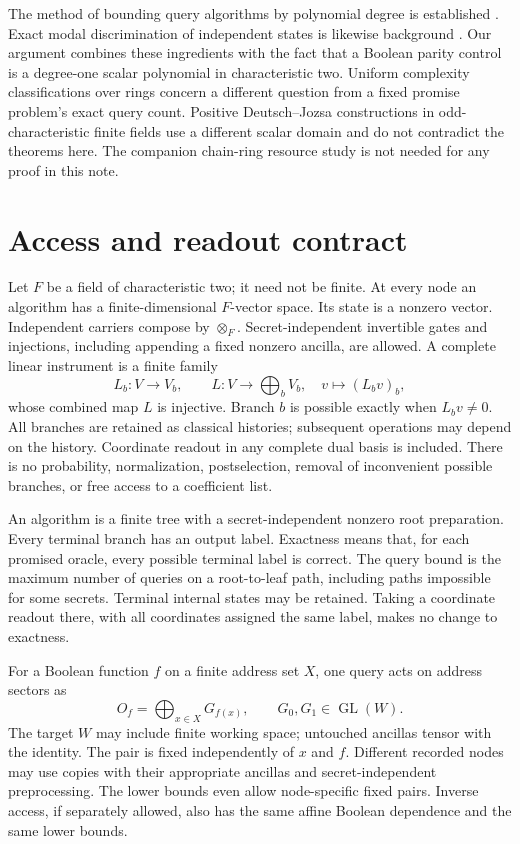 \documentclass[11pt]{article}
\DeclareMathOperator{\GL}{GL}
\begin{document}
The method of bounding query algorithms by polynomial degree is established \cite{Beals2001}. Exact modal discrimination of independent states is likewise background \cite{Diamond2023}. Our argument combines these ingredients with the fact that a Boolean parity control is a degree-one scalar polynomial in characteristic two. Uniform complexity classifications over rings \cite{deBeaudrap2014} concern a different question from a fixed promise problem's exact query count. Positive Deutsch--Jozsa constructions in odd-characteristic finite fields \cite{Hanson2011,Tai2019} use a different scalar domain and do not contradict the theorems here. The companion chain-ring resource study is not needed for any proof in this note.

\section{Access and readout contract}\label{sec:contract}
Let $F$ be a field of characteristic two; it need not be finite. At every node an algorithm has a finite-dimensional $F$-vector space. Its state is a nonzero vector. Independent carriers compose by $\otimes_F$. Secret-independent invertible gates and injections, including appending a fixed nonzero ancilla, are allowed. A complete linear instrument is a finite family
\[
 L_b:V\longrightarrow V_b,\qquad
 L:V\longrightarrow\bigoplus_bV_b,\quad v\longmapsto (L_bv)_b,
\]
whose combined map $L$ is injective. Branch $b$ is possible exactly when $L_bv\ne0$. All branches are retained as classical histories; subsequent operations may depend on the history. Coordinate readout in any complete dual basis is included. There is no probability, normalization, postselection, removal of inconvenient possible branches, or free access to a coefficient list.

An algorithm is a finite tree with a secret-independent nonzero root preparation. Every terminal branch has an output label. Exactness means that, for each promised oracle, every possible terminal label is correct. The query bound is the maximum number of queries on a root-to-leaf path, including paths impossible for some secrets. Terminal internal states may be retained. Taking a coordinate readout there, with all coordinates assigned the same label, makes no change to exactness.

For a Boolean function $f$ on a finite address set $X$, one query acts on address sectors as
\begin{equation}\label{eq:oracle}
 O_f=\bigoplus_{x\in X}G_{f(x)},\qquad G_0,G_1\in\GL(W).
\end{equation}
The target $W$ may include finite working space; untouched ancillas tensor with the identity. The pair is fixed independently of $x$ and $f$. Different recorded nodes may use copies with their appropriate ancillas and secret-independent preprocessing. The lower bounds even allow node-specific fixed pairs. Inverse access, if separately allowed, also has the same affine Boolean dependence and the same lower bounds.
\end{document}
